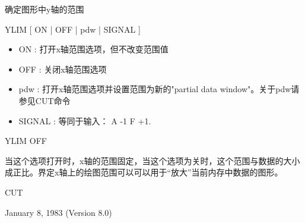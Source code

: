 \label{cmd:ylim}

确定图形中y轴的范围

YLIM [ ON | OFF | pdw | SIGNAL ]

\begin{itemize}
\item ON : 打开x轴范围选项，但不改变范围值 
\item OFF : 关闭x轴范围选项 
\item pdw : 打开x轴范围选项并设置范围为新的"partial data window"。关于pdw请参见CUT命令 
\item SIGNAL : 等同于输入： A -1 F +1. 
\end{itemize}

YLIM OFF

当这个选项打开时，x轴的范围固定，当这个选项为关时，这个范围与数据的大小成正比。界定x轴上的绘图范围可以可以用于``放大''当前内存中数据的图形。

CUT

January 8, 1983 (Version 8.0)
